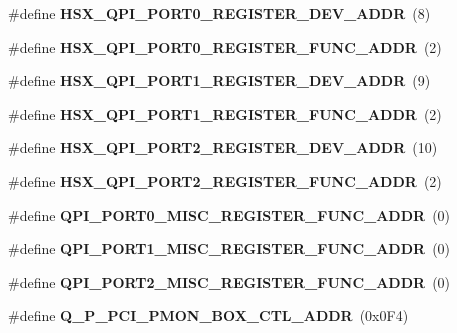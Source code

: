 \begin{DoxyCompactItemize}
\item 
\#define {\bfseries H\+S\+X\+\_\+\+Q\+P\+I\+\_\+\+P\+O\+R\+T0\+\_\+\+R\+E\+G\+I\+S\+T\+E\+R\+\_\+\+D\+E\+V\+\_\+\+A\+D\+DR}~(8)\label{types_8h_a95b6d31ca6901dc2dee96ded36d1d177}

\item 
\#define {\bfseries H\+S\+X\+\_\+\+Q\+P\+I\+\_\+\+P\+O\+R\+T0\+\_\+\+R\+E\+G\+I\+S\+T\+E\+R\+\_\+\+F\+U\+N\+C\+\_\+\+A\+D\+DR}~(2)\label{types_8h_ae40ffef6fe93a4028275f69a769c38cb}

\item 
\#define {\bfseries H\+S\+X\+\_\+\+Q\+P\+I\+\_\+\+P\+O\+R\+T1\+\_\+\+R\+E\+G\+I\+S\+T\+E\+R\+\_\+\+D\+E\+V\+\_\+\+A\+D\+DR}~(9)\label{types_8h_a64985442a941e4070f0585672d0a3340}

\item 
\#define {\bfseries H\+S\+X\+\_\+\+Q\+P\+I\+\_\+\+P\+O\+R\+T1\+\_\+\+R\+E\+G\+I\+S\+T\+E\+R\+\_\+\+F\+U\+N\+C\+\_\+\+A\+D\+DR}~(2)\label{types_8h_a257dd878e1ccdf0c108ad13133d64543}

\item 
\#define {\bfseries H\+S\+X\+\_\+\+Q\+P\+I\+\_\+\+P\+O\+R\+T2\+\_\+\+R\+E\+G\+I\+S\+T\+E\+R\+\_\+\+D\+E\+V\+\_\+\+A\+D\+DR}~(10)\label{types_8h_aba140794faf97a7b88354effb66d83e0}

\item 
\#define {\bfseries H\+S\+X\+\_\+\+Q\+P\+I\+\_\+\+P\+O\+R\+T2\+\_\+\+R\+E\+G\+I\+S\+T\+E\+R\+\_\+\+F\+U\+N\+C\+\_\+\+A\+D\+DR}~(2)\label{types_8h_a5af4ebca9c3867cda66035a6bcdcb548}

\item 
\#define {\bfseries Q\+P\+I\+\_\+\+P\+O\+R\+T0\+\_\+\+M\+I\+S\+C\+\_\+\+R\+E\+G\+I\+S\+T\+E\+R\+\_\+\+F\+U\+N\+C\+\_\+\+A\+D\+DR}~(0)\label{types_8h_a23fe612ba535c6d639bbcecd980ff340}

\item 
\#define {\bfseries Q\+P\+I\+\_\+\+P\+O\+R\+T1\+\_\+\+M\+I\+S\+C\+\_\+\+R\+E\+G\+I\+S\+T\+E\+R\+\_\+\+F\+U\+N\+C\+\_\+\+A\+D\+DR}~(0)\label{types_8h_a7d4c95f2092d55b5e9f61255997f73f4}

\item 
\#define {\bfseries Q\+P\+I\+\_\+\+P\+O\+R\+T2\+\_\+\+M\+I\+S\+C\+\_\+\+R\+E\+G\+I\+S\+T\+E\+R\+\_\+\+F\+U\+N\+C\+\_\+\+A\+D\+DR}~(0)\label{types_8h_a35242ec7f0ef05f8388dd6215dce5fdd}

\item 
\#define {\bfseries Q\+\_\+\+P\+\_\+\+P\+C\+I\+\_\+\+P\+M\+O\+N\+\_\+\+B\+O\+X\+\_\+\+C\+T\+L\+\_\+\+A\+D\+DR}~(0x0\+F4)\label{types_8h_a6ccbec11cd5e24b282e3c196b53e94a0}


\end{DoxyCompactItemize}
